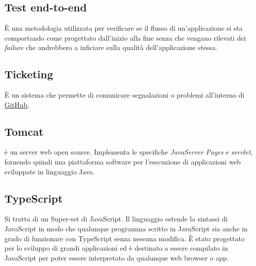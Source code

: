 \section{}
\subsection*{Test end-to-end} È una metodologia utilizzata per verificare se il flusso di un’applicazione si sta comportando come progettato dall’inizio alla fine senza che vengano rilevati dei \textit{failure} che andrebbero a inficiare sulla qualità dell’applicazione stessa.
\subsection*{Ticketing} È un sistema che permette di comunicare segnalazioni o problemi all'interno di \hyperref[sec:GitHub]{\underline{GitHub}}.
\subsection*{Tomcat} è un server web open source. Implementa le specifiche \textit{JavaServer Pages} e \textit{servlet}, fornendo quindi una piattaforma software per l'esecuzione di applicazioni web sviluppate in linguaggio Java.
\subsection*{TypeScript} Si tratta di un Super-set di JavaScript. Il linguaggio estende la sintassi di JavaScript in modo che qualunque programma scritto in JavaScript sia anche in grado di funzionare con TypeScript senza nessuna modifica. È stato progettato per lo sviluppo di grandi applicazioni ed è destinato a essere compilato in JavaScript per poter essere interpretato da qualunque web browser o app.
